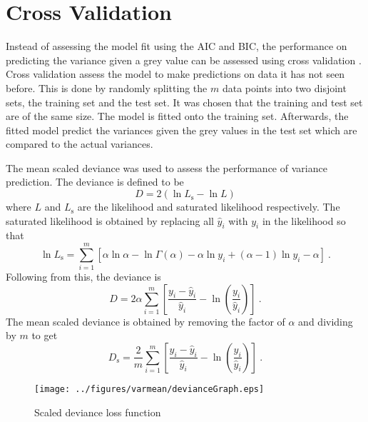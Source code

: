 \section{Cross Validation}

Instead of assessing the model fit using the AIC and BIC, the performance on predicting the variance given a grey value can be assessed using cross validation \citep{friedman2001elements}. Cross validation assess the model to make predictions on data it has not seen before. This is done by randomly splitting the $m$ data points into two disjoint sets, the training set and the test set. It was chosen that the training and test set are of the same size. The model is fitted onto the training set. Afterwards, the fitted model predict the variances given the grey values in the test set which are compared to the actual variances. 

The mean scaled deviance was used to assess the performance of variance prediction. The deviance is defined to be
\begin{equation}
  D = 2\left(
    \ln L_\mathrm{s} - \ln L    
  \right)
\end{equation}
where $L$ and $L_\mathrm{s}$ are the likelihood and saturated likelihood respectively.  The saturated likelihood is obtained by replacing all $\widehat{y}_i$ with $y_i$ in the likelihood so that
\begin{equation}
  \ln L_\mathrm{s} = \sum_{i=1}^m \left[
    \alpha\ln\alpha
    -\ln\Gamma(\alpha)
    -\alpha\ln{y_i}
    +(\alpha-1)\ln y_i
    -\alpha
  \right]
  \ .
\end{equation}
Following from this, the deviance is
\begin{equation}
  D = 2\alpha
  \sum_{i=1}^m\left[
      \dfrac{
          y_i-\widehat{y}_i
      }
      {
          \widehat{y}_i
      }
      - \ln\left(\dfrac{y_i}{\widehat{y}_i}\right)
  \right]
  \ .
\end{equation}
The mean scaled deviance is obtained by removing the factor of $\alpha$ and dividing by $m$ to get
\begin{equation}
    D_\mathrm{s} = \dfrac{2}{m}
    \sum_{i=1}^m\left[
        \dfrac{
            y_i-\widehat{y}_i
        }
        {
            \widehat{y}_i
        }
        - \ln\left(\dfrac{y_i}{\widehat{y}_i}\right)
    \right]
    \ .
\end{equation}

\begin{figure}
  \centering
  \texttt{[image: ../figures/varmean/devianceGraph.eps]}
  \caption{Scaled deviance loss function}
  \label{fig:meanVar_deviance}
\end{figure}

